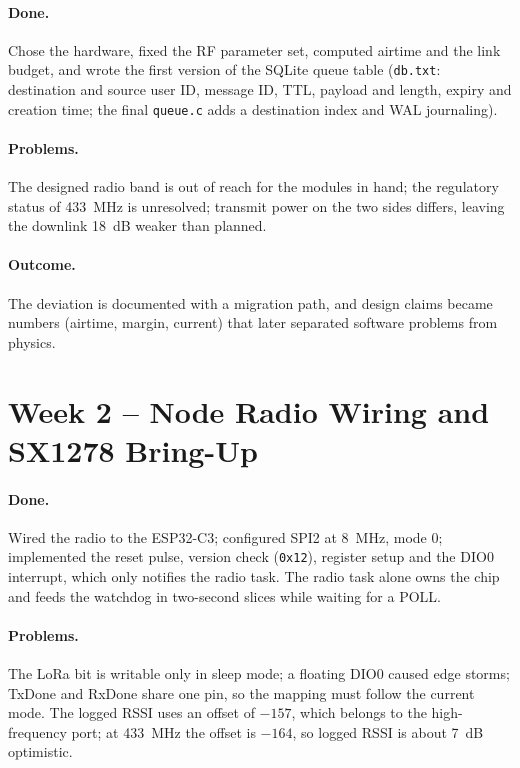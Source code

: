 \documentclass{tietreport}
\begin{document}
\paragraph{Done.} Chose the hardware, fixed the RF parameter set,
computed airtime and the link budget, and wrote the first version of
the SQLite queue table (\texttt{db.txt}: destination and source user
ID, message ID, TTL, payload and length, expiry and creation time;
the final \texttt{queue.c} adds a destination index and WAL
journaling).

\paragraph{Problems.} The designed radio band is out of reach for the
modules in hand; the regulatory status of 433~MHz is unresolved;
transmit power on the two sides differs, leaving the downlink 18~dB
weaker than planned.

\paragraph{Outcome.} The deviation is documented with a migration
path, and design claims became numbers (airtime, margin, current)
that later separated software problems from physics.

\section{Week 2 -- Node Radio Wiring and SX1278 Bring-Up}

\paragraph{Done.} Wired the radio to the ESP32-C3; configured SPI2
at 8~MHz, mode 0; implemented the reset pulse, version check
(\texttt{0x12}), register setup and the DIO0 interrupt, which only
notifies the radio task. The radio task alone owns the chip and feeds
the watchdog in two-second slices while waiting for a POLL.

\paragraph{Problems.} The LoRa bit is writable only in sleep mode; a
floating DIO0 caused edge storms; TxDone and RxDone share one pin, so
the mapping must follow the current mode. The logged RSSI uses an
offset of $-157$, which belongs to the high-frequency port; at 433~MHz
the offset is $-164$, so logged RSSI is about 7~dB optimistic.
\end{document}
